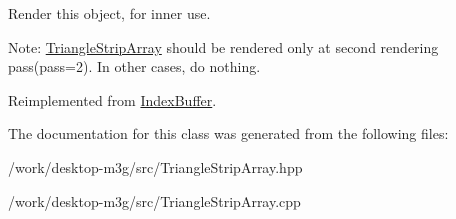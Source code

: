 Render this object, for inner use.

Note: \hyperlink{classm3g_1_1TriangleStripArray}{TriangleStripArray} should be rendered only at second rendering pass(pass=2). In other cases, do nothing. 

Reimplemented from \hyperlink{classm3g_1_1IndexBuffer_1efcb1973989d9963d5bd6d03065d389}{IndexBuffer}.

The documentation for this class was generated from the following files:\begin{CompactItemize}
\item 
/work/desktop-m3g/src/TriangleStripArray.hpp\item 
/work/desktop-m3g/src/TriangleStripArray.cpp\end{CompactItemize}
